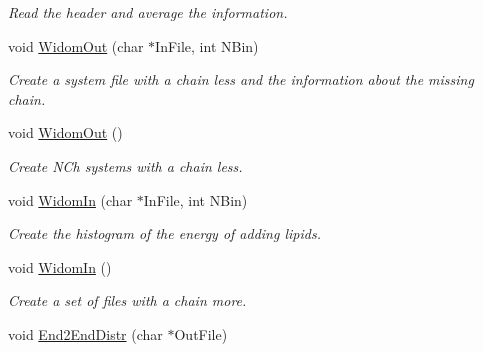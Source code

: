\begin{DoxyCompactItemize}
\begin{DoxyCompactList}\small\item\em Read the header and average the information. \end{DoxyCompactList}\item 
void \hyperlink{classElPoly_aa7a92147aff6a466398908e0f92ca139}{Widom\+Out} (char $\ast$In\+File, int N\+Bin)\hypertarget{classElPoly_aa7a92147aff6a466398908e0f92ca139}{}\label{classElPoly_aa7a92147aff6a466398908e0f92ca139}

\begin{DoxyCompactList}\small\item\em Create a system file with a chain less and the information about the missing chain. \end{DoxyCompactList}\item 
void \hyperlink{classElPoly_ab6f6a1fc647dcd4684fcaa667d612099}{Widom\+Out} ()\hypertarget{classElPoly_ab6f6a1fc647dcd4684fcaa667d612099}{}\label{classElPoly_ab6f6a1fc647dcd4684fcaa667d612099}

\begin{DoxyCompactList}\small\item\em Create N\+Ch systems with a chain less. \end{DoxyCompactList}\item 
void \hyperlink{classElPoly_a3e5c7ada1f6d5a2d37b23a9fb12771f9}{Widom\+In} (char $\ast$In\+File, int N\+Bin)\hypertarget{classElPoly_a3e5c7ada1f6d5a2d37b23a9fb12771f9}{}\label{classElPoly_a3e5c7ada1f6d5a2d37b23a9fb12771f9}

\begin{DoxyCompactList}\small\item\em Create the histogram of the energy of adding lipids. \end{DoxyCompactList}\item 
void \hyperlink{classElPoly_a2fbe8fbc91f83f0ac7a947965a3c38b8}{Widom\+In} ()\hypertarget{classElPoly_a2fbe8fbc91f83f0ac7a947965a3c38b8}{}\label{classElPoly_a2fbe8fbc91f83f0ac7a947965a3c38b8}

\begin{DoxyCompactList}\small\item\em Create a set of files with a chain more. \end{DoxyCompactList}\item 
void \hyperlink{classElPoly_a15ee2b235143aabc133fe974aa3258a2}{End2\+End\+Distr} (char $\ast$Out\+File)\hypertarget{classElPoly_a15ee2b235143aabc133fe974aa3258a2}{}\label{classElPoly_a15ee2b235143aabc133fe974aa3258a2}


\end{DoxyCompactItemize}
